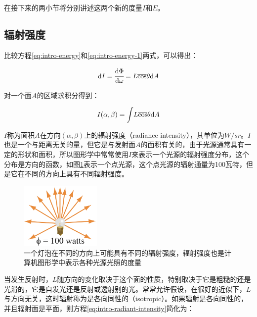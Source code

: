 \noindent 在接下来的两小节将分别讲述这两个新的度量$I$和$E$。





\subsection{辐射强度}
比较方程\ref{eq:intro-energy}和\ref{eq:intro-energy-1}两式，可以得出：

\begin{equation}
	{\rm d}I= \cfrac{{\rm d}\Phi}{{\rm d}\omega}=L\overline{\cos}\theta {\rm d}A
\end{equation}

\noindent 对一个面$A$的区域求积分得到：

\begin{equation}\label{eq:intro-radiant-intensity}
	I(\alpha,\beta)={\rm \int} L\overline{\cos}\theta {\rm d}A
\end{equation}

$I$称为面积$A$在方向$(\alpha,\beta)$上的辐射强度（radiance intensity），其单位为$W/sr$。$I$也是一个与距离无关的量，但它是与发射面$A$的面积有关的，由于光源通常具有一定的形状和面积，所以图形学中常常使用$I$来表示一个光源的辐射强度分布，这个分布是方向的函数，如图\ref{f:intro-radiant-intensity}表示一个点光源，这个点光源的辐射通量为100瓦特，但是它在不同的方向上具有不同辐射强度。

\begin{figure}
\sidecaption
	\includegraphics[width=0.35\textwidth]{figures/intro/radiant-intensity}
	\caption{一个灯泡在不同的方向上可能具有不同的辐射强度，辐射强度也是计算机图形学中表示各种光源光照的度量}
	\label{f:intro-radiant-intensity}
\end{figure}

当发生反射时，$L$随方向的变化取决于这个面的性质，特别取决于它是粗糙的还是光滑的，它是自发光还是反射或透射别的光。常常允许假设，在很好的近似下，$L$与方向无关，这时辐射称为是各向同性的（isotropic）。如果辐射是各向同性的，并且辐射面是平面，则方程\ref{eq:intro-radiant-intensity}简化为：

